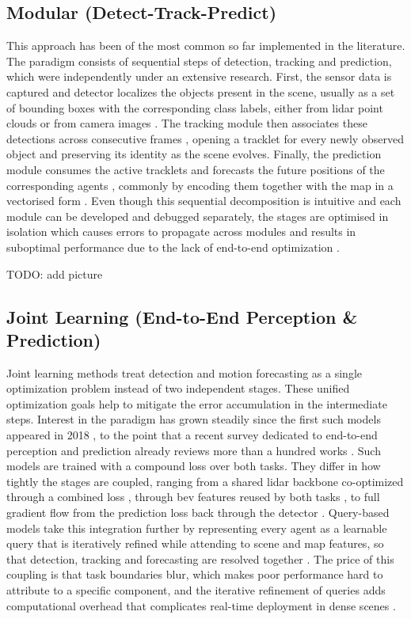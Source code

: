 \subsection{Modular (Detect-Track-Predict)}
\label{subsec:sota-modular}
This approach has been of the most common so far implemented in the literature. The paradigm consists 
of sequential steps of detection, tracking and prediction, which were independently under an extensive research. First, the sensor data is captured and
detector localizes the objects present in the scene, usually as a set of bounding boxes with the
corresponding class labels, either from \ac{lidar} point clouds \cite{Yin2021CenterPoint} or from camera
images \cite{Wang2021DETR3D}. The tracking module then associates these detections across consecutive
frames \cite{Kalman1960}, opening a tracklet for every newly observed object and preserving its identity as
the scene evolves. Finally, the prediction module consumes the active tracklets and forecasts the future
positions of the corresponding agents \cite{madjid2025survey}, commonly by encoding them together with the
map in a vectorised form \cite{VectorNet2020,Liang2020LaneGCN}.
Even though this sequential decomposition is intuitive and each module can be developed and debugged
separately, the stages are optimised in isolation which causes errors to propagate 
across modules and results in suboptimal performance due to the lack of end-to-end optimization \cite{hu2025survey}.

TODO: add picture 

\subsection{Joint Learning (End-to-End Perception \& Prediction)}
\label{subsec:sota-e2e}
Joint learning methods treat detection and motion forecasting as a single optimization problem instead of two independent stages.
These unified optimization goals help to mitigate the error accumulation in the intermediate steps.
Interest in the paradigm has grown steadily since the first such models appeared in 2018
\cite{Luo2018FaF}, to the point that
a recent survey dedicated to end-to-end perception and prediction already reviews more than a hundred works
\cite{hu2025survey}.
Such models are trained with a compound loss over both tasks. They differ in how tightly the stages are coupled,
ranging from a shared \ac{lidar} backbone co-optimized through
a combined loss \cite{Luo2018FaF}, through \ac{bev} features reused by both tasks \cite{Hu2021FIERY}, to full
gradient flow from the prediction loss back through the detector \cite{Liang2020PnPNet}. Query-based models
take this integration further by representing every agent as a learnable query that is iteratively refined
while attending to scene and map features, so that detection, tracking and forecasting are resolved together
\cite{Gu2023ViP3D,Casas2024DeTra}.
The price of this coupling is that task boundaries blur, which makes poor performance hard to attribute to a
specific component, and the iterative refinement of queries adds computational overhead that complicates
real-time deployment in dense scenes \cite{madjid2025survey}.

